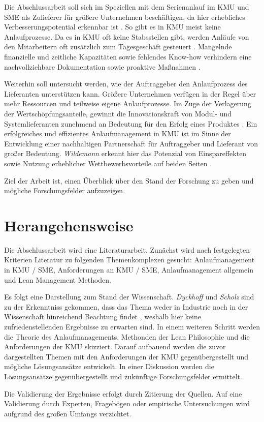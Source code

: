 \documentclass[%
a4paper,
aps,
pra,
 longbibliography,
 lengthcheck,%
]{revtex4-1}
\begin{document}
Die Abschlussarbeit soll sich im Speziellen mit dem Serienanlauf im KMU und SME als Zulieferer für größere Unternehmen beschäftigen, da hier erhebliches Verbesserungspotential erkennbar ist \cite[S.18]{Dombrowski2009a}. So gibt es in KMU meist keine Anlaufprozesse. Da es in KMU oft keine Stabsstellen gibt, werden Anläufe von den Mitarbeitern oft zusätzlich zum Tagesgeschäft gesteuert \cite{Dombrowski2009}. %
Mangelnde finanzielle und zeitliche Kapazitäten sowie fehlendes Know-how verhindern eine nachvollziehbare Dokumentation sowie proaktive Maßnahmen \cite{Zimolong2006,Dombrowski2009a}. 

Weiterhin soll untersucht werden, wie der Auftraggeber den Anlaufprozess des Lieferanten unterstützen kann. Größere Unternehmen verfügen in der Regel über mehr Ressourcen und teilweise eigene Anlaufprozesse. Im Zuge der Verlagerung der Wertschöpfungsanteile, gewinnt die Innovationskraft von Modul- und Systemlieferanten zunehmend an Bedeutung für den Erfolg eines Produktes \cite{Kuhn2002}. Ein erfolgreiches und effizientes Anlaufmanagement in KMU ist im Sinne der Entwicklung einer nachhaltigen Partnerschaft für Auftraggeber und Lieferant von großer Bedeutung. \textit{Wildemann} erkennt hier das Potenzial von Einspareffekten sowie Nutzung erheblicher Wettbewerbsvorteile auf beiden Seiten \cite{Wildemann2008}.

Ziel der Arbeit ist, einen Überblick über den Stand der Forschung zu geben und mögliche Forschungsfelder aufzuzeigen. 

\section{Herangehensweise}
Die Abschlussarbeit wird eine Literaturarbeit. Zunächst wird nach festgelegten Kriterien Literatur zu folgenden Themenkomplexen gesucht: Anlaufmanagement in KMU / SME, Anforderungen an KMU / SME, Anlaufmanagement allgemein und Lean Management Methoden.

Es folgt eine Darstellung zum Stand der Wissenschaft. \textit{Dyckhoff} und \textit{Scholz} sind zu der Erkenntniss gekommen, dass das Thema weder in Industrie noch in der Wissenschaft hinreichend Beachtung findet \cite{Dyckhoff2012, Scholz2010}, weshalb hier keine zufriedenstellenden Ergebnisse zu erwarten sind. In einem weiteren Schritt werden die Theorie des Anlaufmanagements, Methonden der Lean Philosophie und die Anforderungen der KMU skizziert. 
Darauf aufbauend werden die zuvor dargestellten Themen mit den Anforderungen der KMU gegenübergestellt und mögliche Lösungsansätze entwickelt. In einer Diskussion werden die Lösungsansätze gegenübergestellt und zukünftige Forschungsfelder ermittelt. 

Die Validierung der Ergebnisse erfolgt durch Zitierung der Quellen. Auf eine Validierung durch Experten, Fragebögen oder empirische Untersuchungen wird aufgrund des großen Umfangs verzichtet. 

\vspace{1cm}

\end{document}

